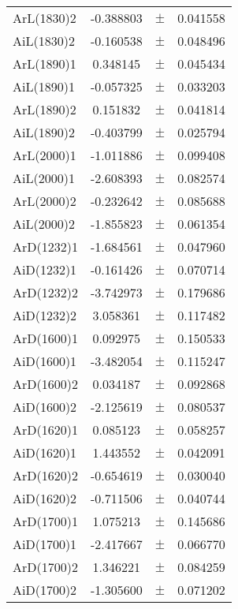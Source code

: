 \begin{table}
\begin{tiny}
\begin{tabular}{lccc}
ArL(1830)2 & -0.388803 & $\pm$ & 0.041558 \\
AiL(1830)2 & -0.160538 & $\pm$ & 0.048496 \\
ArL(1890)1 & 0.348145 & $\pm$ & 0.045434 \\
AiL(1890)1 & -0.057325 & $\pm$ & 0.033203 \\
ArL(1890)2 & 0.151832 & $\pm$ & 0.041814 \\
AiL(1890)2 & -0.403799 & $\pm$ & 0.025794 \\
ArL(2000)1 & -1.011886 & $\pm$ & 0.099408 \\
AiL(2000)1 & -2.608393 & $\pm$ & 0.082574 \\
ArL(2000)2 & -0.232642 & $\pm$ & 0.085688 \\
AiL(2000)2 & -1.855823 & $\pm$ & 0.061354 \\
ArD(1232)1 & -1.684561 & $\pm$ & 0.047960 \\
AiD(1232)1 & -0.161426 & $\pm$ & 0.070714 \\
ArD(1232)2 & -3.742973 & $\pm$ & 0.179686 \\
AiD(1232)2 & 3.058361 & $\pm$ & 0.117482 \\
ArD(1600)1 & 0.092975 & $\pm$ & 0.150533 \\
AiD(1600)1 & -3.482054 & $\pm$ & 0.115247 \\
ArD(1600)2 & 0.034187 & $\pm$ & 0.092868 \\
AiD(1600)2 & -2.125619 & $\pm$ & 0.080537 \\
ArD(1620)1 & 0.085123 & $\pm$ & 0.058257 \\
AiD(1620)1 & 1.443552 & $\pm$ & 0.042091 \\
ArD(1620)2 & -0.654619 & $\pm$ & 0.030040 \\
AiD(1620)2 & -0.711506 & $\pm$ & 0.040744 \\
ArD(1700)1 & 1.075213 & $\pm$ & 0.145686 \\
AiD(1700)1 & -2.417667 & $\pm$ & 0.066770 \\
ArD(1700)2 & 1.346221 & $\pm$ & 0.084259 \\
AiD(1700)2 & -1.305600 & $\pm$ & 0.071202 \\
\bottomrule
\end{tabular}
\end{tiny}
\end{table}

\clearpage

